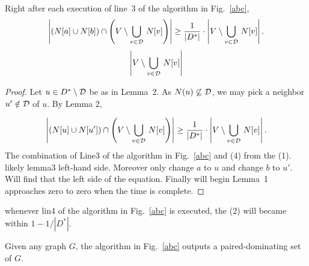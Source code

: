 \documentclass[12pt]{article}
\begin{document}
\begin{lemma}
Right after each execution of line~3 of the algorithm in Fig.~\ref{abc},
\begin{equation}
\left|\left(N[a]\cup N[b]\right)\cap \left(V\setminus \bigcup_{v\in {\cal D}}\,N[v]\right)\right|
\ge \frac{1}{|D^*|}
\cdot\left|V\setminus \bigcup_{v\in {\cal D}}\,N[v]\right|.
\end{equation}
\begin{equation}
\left|V\setminus \bigcup_{v\in {\cal D}}\,N[v]\right|
\end{equation}
\end{lemma}
\begin{proof}
Let $u\in D^*\setminus {\cal D}$ be as in Lemma~2. As $N(u)\not\subseteq {\cal D}$, we may pick a neighbor $u'\notin {\cal D}$ of $u$. By Lemma 2,

\begin{equation}
\left|\left(N[u]\cup N[u']\right)\cap \left(V\setminus \bigcup_{v\in {\cal D}}\,N[v]\right)\right|
\ge \frac{1}{|D^*|}
\cdot\left|V\setminus \bigcup_{v\in {\cal D}}\,N[v]\right|.
\end{equation}
The combination of Line3 of the algorithm in Fig.~\ref{abc} and (4) from the (1).
likely lemma3 left-hand side. Moreover only change $a$ to $u$ and change $b$ to $u'$. Will find that the left side of the equation. Finally will begin Lemma~1 approaches zero to zero when the time is complete.
\end{proof}
\begin{lemma}
whenever lin4 of the algorithm in Fig.~\ref{abc} is executed, the (2) will became within $1-1/|D^*|$.

\end{lemma}


\begin{lemma}
Given any graph $G$, the algorithm in Fig.~\ref{abc} outputs a paired-dominating set of $G$.
\end{lemma}



\end{document}
